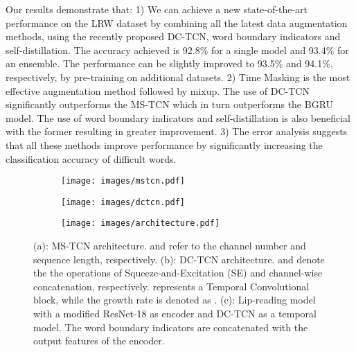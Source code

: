 \documentclass{article}
\newcommand*\circled[1]{\tikz[baseline=(char.base)]{
            \node[shape=circle,draw,inner sep=0.3pt] (char) {#1};}}
\begin{document}
Our results demonstrate that: 1) We can achieve a new state-of-the-art performance on the LRW dataset by combining all the latest data augmentation methods, using the recently proposed DC-TCN, word boundary indicators and self-distillation. The accuracy achieved is 92.8\% for a single model and 93.4\% for an ensemble. The performance can be slightly improved to 93.5\% and 94.1\%, respectively, by pre-training on additional datasets. 2) Time Masking is the most effective augmentation method followed by mixup. The use of DC-TCN significantly outperforms the MS-TCN which in turn outperforms the BGRU model. The use of word boundary indicators and self-distillation is also beneficial with the former resulting in greater improvement. 3) The error analysis suggests that all these methods improve performance by significantly increasing the classification accuracy of difficult words.

\begin{figure*}[!t]
    \centering
    \begin{subfigure}{.31\linewidth}
        \centering
        \texttt{[image: images/mstcn.pdf]}
        \caption{}
        \label{fig:mstcn}  
    \end{subfigure}
    \qquad
    \begin{subfigure}{.31\linewidth}
        \centering
        \texttt{[image: images/dctcn.pdf]}
        \caption{}
        \label{fig:dc_tcn}  
    \end{subfigure}
    \quad
    \begin{subfigure}{.31\linewidth}
        \centering
        \texttt{[image: images/architecture.pdf]}
        \caption{}
        \label{fig:c}  
    \end{subfigure}
    \caption[architecture]{(a): MS-TCN architecture. \protect{} and \protect{} refer to the channel number and sequence length, respectively. (b): DC-TCN architecture. \circled{{\footnotesize SE}} and \circled{{\footnotesize C}} denote the the operations of Squeeze-and-Excitation (SE) \cite{hu2018squeeze} and channel-wise concatenation, respectively. \protect{} represents a Temporal Convolutional block, while the growth rate is denoted as \protect{}.
(c): Lip-reading model with a modified ResNet-18 as encoder and DC-TCN as a temporal model. The word boundary indicators are concatenated with the output features of the encoder.}
\label{fig:architecture}
\vspace{-0.5cm}
\end{figure*} \vspace{-0.3cm}
\end{document}
